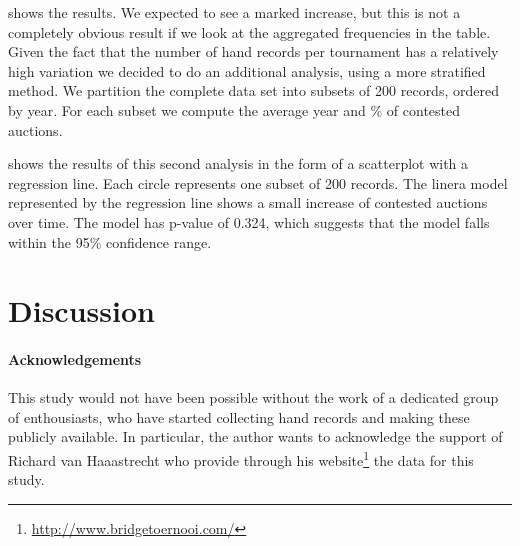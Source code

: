 \documentclass{llncs}
\begin{document}
 shows the results. We expected to see a
marked increase, but this is not a completely obvious result if we look
at the 
aggregated frequencies in the table. Given the fact that the number of
hand records per tournament has a relatively high variation we decided
to do an additional analysis, using a more stratified 
method. We partition the complete data set into subsets of 200
records, ordered by year. For each subset we compute the average year
and \% of contested auctions.    


 shows the results of this second analysis in
the form of a scatterplot with a regression line. Each circle
represents one subset of 200 records. The linera model represented by
the regression line shows a small increase of contested auctions over
time. The model has p-value of 0.324, which suggests that the model
falls within the 95\% confidence range. 


\section{Discussion}


\label{sec:discussion}

\paragraph{Acknowledgements}
This study would not have been possible without the work of a
dedicated group of enthousiasts, who have started collecting hand
records and 
making these publicly available. In particular, the author wants to
acknowledge the support of Richard van Haaastrecht who provide through
his website\footnote{\url{http://www.bridgetoernooi.com/}} the data
for this study.  



\end{document}
